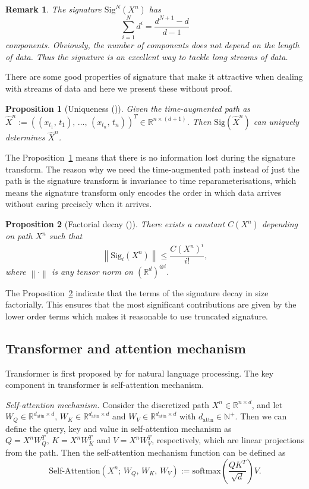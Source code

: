 \documentclass[]{article}
\newtheorem{remark}{\hspace{6mm}Remark}[section]
\newtheorem{proposition}{\hspace{6mm}Proposition}[section]
\renewcommand{\(}{\left(}
\renewcommand{\)}{\right)}
\begin{document}
	\begin{remark}
		\label{rmk-length-signature}
		The signature $\text{Sig}^N(X^n)$ has $$\sum\limits_{i=1}^{N}d^i=\frac{d^{N+1}-d}{d-1}$$ components. Obviously, the number of components does not depend on the length of data. Thus the signature is an excellent way to tackle long streams of data.
	\end{remark}
	There are some good properties of signature that make it attractive when dealing with streams of data and here we present these without proof. 
	\begin{proposition}[Uniqueness (\cite{Lyons_2010_uniqueness})]
		\label{prop-uniqueness}
		Given the time-augmented path as $\widehat{X}^n:={((x_{t_1},\,t_1),\,\ldots,\,(x_{t_n},\,t_n))}^T\in\mathbb{R}^{n\times(d+1)}$. Then $\text{Sig}(\widehat{X}^n)$ can uniquely determines $\widehat{X}^n$.
	\end{proposition}
	The Proposition~\ref{prop-uniqueness} means that there is no information lost during the signature transform. The reason why we need the time-augmented path instead of just the path is the signature transform is invariance to time reparameterisations, which means the signature transform only encodes the order in which data arrives without caring precisely when it arrives.
	\begin{proposition}[Factorial decay (\cite{Lyons_1998_decay})]
		\label{prop-decay}
		There exists a constant $C(X^n)$ depending on path $X^n$ such that $$\left\|\text{Sig}_i(X^n)\right\| \leq \frac{C(X^n)^i}{i!},$$ where $\left\|\cdot\right\|$ is any tensor norm on ${(\mathbb{R}^d)}^{\otimes i}$.
	\end{proposition}
	The Proposition~\ref{prop-decay} indicate that the terms of the signature decay in size factorially. This ensures that the most significant contributions are given by the lower order terms which makes it reasonable to use truncated signature. 
	
	\subsection{Transformer and attention mechanism}\label{subsec-transformer}
	Transformer is first proposed by \cite{vaswani_2017} for natural language processing. The key component in transformer is self-attention mechanism.
	
	\textit{Self-attention mechanism.} Consider the discretized path $X^n\in\mathbb{R}^{n\times d}$, and let $W_Q\in\mathbb{R}^{d_{\text{attn}}\times d},\,W_K\in\mathbb{R}^{d_{\text{attn}}\times d}$ and $W_V\in\mathbb{R}^{d_{\text{attn}}\times d}$ with $d_{\text{attn}}\in\mathbb{N}^+$. Then we can define the query, key and value in self-attention mechanism as $Q=X^nW_Q^T,\, K=X^nW_K^T$ and $V=X^nW_V^T$, respectively, which are linear projections from the path. Then the self-attention mechanism function can be defined as
	\begin{equation}
		\label{eq-single-attention}
		\text{Self-Attention}(X^n;\,W_Q,\,W_K,\,W_V):=\text{softmax}\left(\frac{QK^T}{\sqrt{d}}\right)V.
	\end{equation}
	
\end{document}
